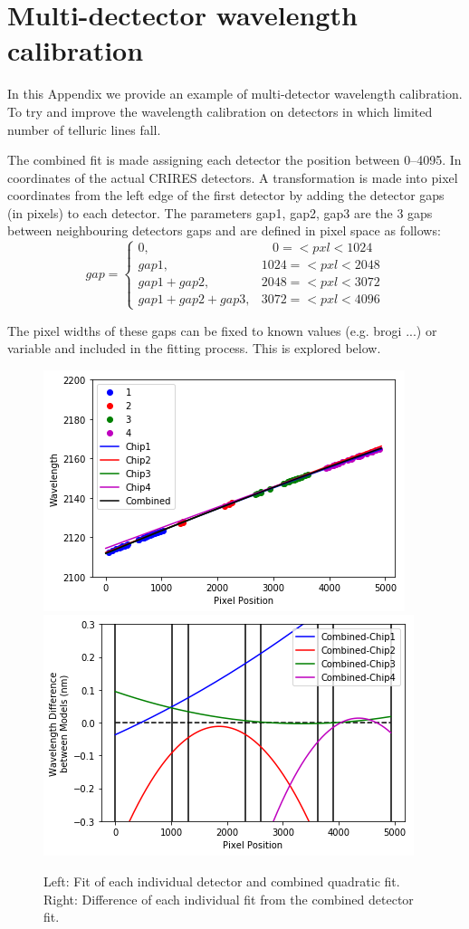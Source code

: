 
\chapter{Multi-dectector wavelength calibration} %
\label{appendix:wavelength_fitting}

In this Appendix we provide an example of multi-detector wavelength calibration. To try and improve the wavelength calibration on detectors in which limited number of telluric lines fall.


The combined fit is made assigning each detector the position between 0--4095. In coordinates of the actual CRIRES detectors. A transformation is made into pixel coordinates from the left edge of the first detector by adding the detector gaps (in pixels) to each detector. The parameters gap1, gap2, gap3 are the 3 gaps between neighbouring detectors gaps and are defined in pixel space as follows:
\[
gap =\begin{cases}
0,                      &~~~~0=<pxl<1024\\
gap1,                   &1024=<pxl<2048\\
gap1 + gap2,            &2048=<pxl<3072\\
gap1 + gap2 + gap3,     &3072=<pxl<4096
\end{cases}
\]

The pixel widths of these gaps can be fixed to known values (e.g. brogi ...) or variable and included in the fitting process. This is explored below.




\begin{figure}
    \centering
    \includegraphics[width=0.45\linewidth]{./figures/appendix/multi_detector_fit}
    \includegraphics[width=0.45\linewidth]{./figures/appendix/multidector_fit_diff}
    \caption{Left: Fit of each individual detector and combined quadratic fit. Right: Difference of each individual fit from the combined detector fit.}
    \label{fig:multidectorfitdiff}
\end{figure}



